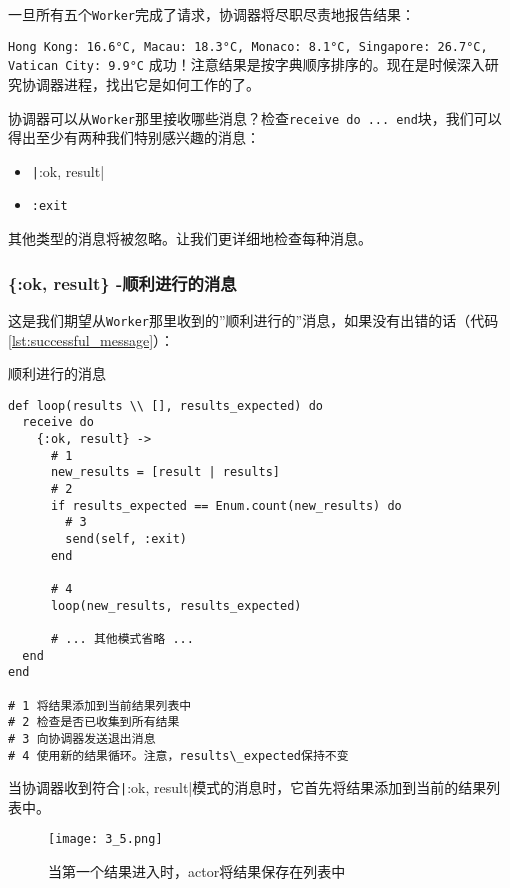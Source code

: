 一旦所有五个\texttt{Worker}完成了请求，协调器将尽职尽责地报告结果：

\texttt{Hong Kong: 16.6°C, Macau: 18.3°C, Monaco: 8.1°C, Singapore: 26.7°C, Vatican City: 9.9°C}
成功！注意结果是按字典顺序排序的。现在是时候深入研究协调器进程，找出它是如何工作的了。

协调器可以从\texttt{Worker}那里接收哪些消息？检查\texttt{receive do ... end}块，我们可以得出至少有两种我们特别感兴趣的消息：

\begin{itemize}
	\item \texttt|{:ok, result}|
  \item \texttt{:exit}
\end{itemize}

其他类型的消息将被忽略。让我们更详细地检查每种消息。

\subsubsection{\{:ok, result\} -顺利进行的消息}

这是我们期望从\texttt{Worker}那里收到的''顺利进行的''消息，如果没有出错的话（代码\ref{lst:successful_message}）：


\begin{code}{顺利进行的消息}
\begin{verbatim}
def loop(results \\ [], results_expected) do
  receive do
    {:ok, result} ->
      # 1
      new_results = [result | results]
      # 2
      if results_expected == Enum.count(new_results) do
        # 3
        send(self, :exit)
      end

      # 4
      loop(new_results, results_expected)

      # ... 其他模式省略 ...
  end
end

# 1 将结果添加到当前结果列表中
# 2 检查是否已收集到所有结果
# 3 向协调器发送退出消息
# 4 使用新的结果循环。注意，results\_expected保持不变
\end{verbatim}
\label{lst:successful_message}
\end{code}


当协调器收到符合\texttt|{:ok, result}|模式的消息时，它首先将结果添加到当前的结果列表中。

\begin{figure}[!ht]
    \centering
    \texttt{[image: 3\_5.png]}
    \caption{当第一个结果进入时，actor将结果保存在列表中}
    \label{fig:3_5}
\end{figure}


